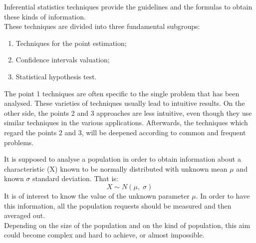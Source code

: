 \begin{frame}
  Inferential statistics techniques provide the guidelines and the formulas to obtain these kinds of information.\\
  \vspace*{.25cm}
  These techniques are divided into three fundamental subgroups:
  \begin{enumerate}
    \item Techniques for the point estimation;
    \vspace*{.25cm}
    \item Confidence intervals valuation;
    \vspace*{.25cm}
    \item Statistical hypothesis test.
  \end{enumerate}
  \vspace*{.25cm}
  The point 1 techniques are often specific to the single problem that has been analysed. These varieties of techniques usually lead to intuitive results. On the other side, the points 2 and 3 approaches are less intuitive, even though they use similar techniques in the various applications. Afterwards, the techniques which regard the points 2 and 3, will be deepened according to common and frequent problems.
\end{frame}




\begin{frame}
    \vspace*{.25cm}
    It is supposed to analyse a population in order to obtain information about a characteristic (X) known to be normally distributed with unknown mean $ \mu $ and known $ \sigma $ standard deviation. That is:
    $$ X \sim N(\mu,\; \sigma) $$
    It is of interest to know the value of the unknown parameter $ \mu $. In order to have this information, all the population requests should be measured and then averaged out.\\
    \vspace*{.25cm}
    Depending on the size of the population and on the kind of population, this aim could become complex and hard to achieve, or almost impossible.\\
\end{frame}

